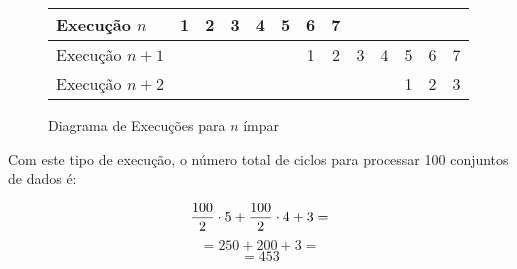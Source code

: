 \begin{figure}[H]
\centering
\begin{tabular}{|l||c|c|c|c|c|c|c|c|c|c|c|c|}
\hline
Execução $n$ & 1 & 2 & 3 & 4 & 5 & 6 & 7 &&&&&\\
\hline
Execução $n+1$ &&&&&& 1 & 2 & 3 & 4 & 5 & 6 & 7 \\
\hline
Execução $n+2$ &&&&&&&&&& 1 & 2 & 3 \\
\hline
\end{tabular}
\caption{Diagrama de Execuções para $n$ ímpar}
\label{fig:datapath}
\end{figure}

Com este tipo de execução, o número total de ciclos para processar 100 conjuntos de dados é:

\[{100\over 2} \cdot 5 + {100\over 2} \cdot 4 + 3 =\]
\[= 250 + 200 + 3 =\]
\[= 453\]